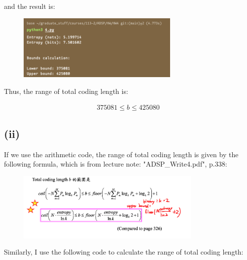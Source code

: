 \documentclass{article}
\begin{document}
and the result is:

\begin{figure}[H]
    \centering
    \includegraphics[width=0.7\textwidth]{HW4_img/4_result_huffman.png}
\end{figure}

Thus, the range of total coding length is:

\begin{align*}
    375081 \leq b \leq 425080
\end{align*}


\subsection*{(ii)}

If we use the arithmetic code, the range of total coding length is given by the following formula, 
which is from lecture note: "ADSP\_Write4.pdf", p.338:

\begin{figure}[H]
    \centering
    \includegraphics[width=0.8\textwidth]{HW4_img/4_arithmetic_code_total_coding_length.png}
\end{figure}

\bigskip

Similarly, I use the following code to calculate the range of total coding length:
\end{document}
